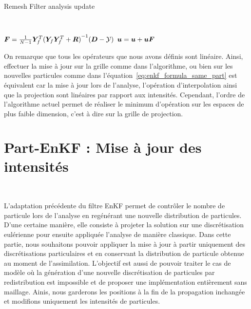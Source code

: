 \begin{algorithm}

    \caption{Remesh Filter analysis update}~\label{algo:remesh_enkf}


    $ \bm{F} = \frac{1}{N-1}\bm Y_f^T {(\bm Y_f \bm Y_f^T + \bm R)}^{-1}(\bm{D} - \mathcal{Y})$ 
    $\bm u = \bm u + \bm u \bm{F}$ 
\end{algorithm}


On remarque que tous les opérateurs que nous avons définis sont linéaire. Ainsi, effectuer la mise à jour sur la grille comme dans l'algorithme, ou bien sur les nouvelles particules comme dans l'équation~\eqref{eq:enkf_formula_same_part} est équivalent car la mise à jour lors de l'analyse, l'opération d'interpolation ainsi que la projection sont linéaires par rapport aux intensités.
Cependant, l'ordre de l'algorithme actuel permet de réaliser le minimum d'opération sur les espaces de plus faible dimension, c'est à dire sur la grille de projection.

\section{Part-EnKF : Mise à jour des intensités}~\label{sec:part_enkf}

L'adaptation précédente du filtre EnKF permet de contrôler le nombre de particule lors de l'analyse en regénérant une nouvelle distribution de particules. D'une certaine manière, elle consiste à projeter la solution sur une discrétisation eulérienne pour ensuite appliquée l'analyse de manière classique.
Dans cette partie, nous souhaitons pouvoir appliquer la mise à jour à partir uniquement des discrétisations particulaires et en conservant la distribution de particule obtenue au moment de l'assimilation. L'objectif est aussi de pouvoir traiter le cas de modèle où la génération d'une nouvelle discrétisation de particules par redistribution est impossible et de proposer une implémentation entièrement sans maillage.
Ainis, nous garderons les positions à la fin de la propagation inchangée et modifions uniquement les intensités de particules.

